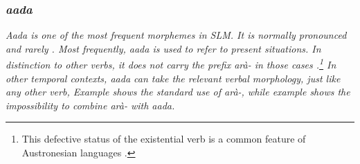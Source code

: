 




\subsubsection{\em aada\em}\label{sec:wc:Existentialverbs:aada}
\em Aada \em is one of the most frequent morphemes in SLM. It is normally pronounced  and rarely . Most frequently, \em aada \em is used to refer to present situations. In distinction to other verbs, it does not carry the  prefix \em arà- \em in those cases \citep[cf.][169]{SmithEtAl2006cll}.\footnote{This defective status of the existential verb is a common feature of Austronesian languages \citep[138]{Himmelmann2005typochar}.} In other temporal contexts, \em aada \em can take the relevant verbal morphology, just like any other verb, Example  shows the standard use of \em arà-, \em while example  shows the impossibility to combine \em arà- \em with  \em aada. \em



